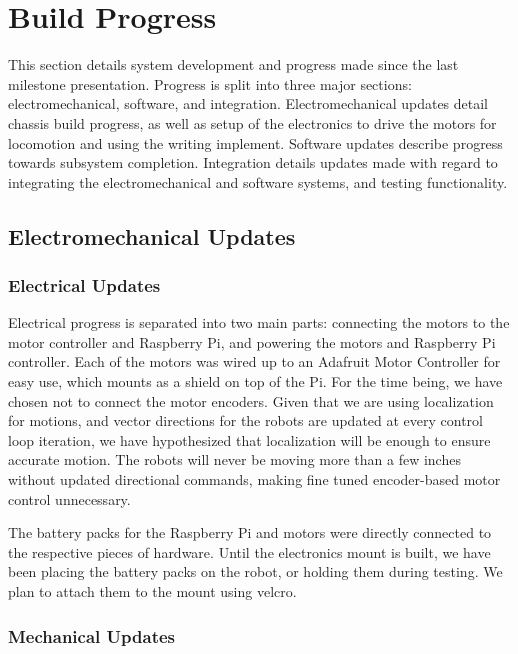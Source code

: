 
\section{Build Progress}
\label{sec:build_progress}

This section details system development and progress made since the last milestone presentation. Progress is split into three major sections: electromechanical, software, and integration. Electromechanical updates detail chassis build progress, as well as setup of the electronics to drive the motors for locomotion and using the writing implement. Software updates describe progress towards subsystem completion. Integration details updates made with regard to integrating the electromechanical and software systems, and testing functionality.

\subsection{Electromechanical Updates}
\label{sec:electromechanical_progress}

\subsubsection{Electrical Updates}
\label{sec:electrical_progress}
Electrical progress is separated into two main parts: connecting the motors to the motor controller and Raspberry Pi, and powering the motors and Raspberry Pi controller. Each of the motors was wired up to an Adafruit Motor Controller for easy use, which mounts as a shield on top of the Pi. For the time being, we have chosen not to connect the motor encoders. Given that we are using localization for motions, and vector directions for the robots are updated at every control loop iteration, we have hypothesized that localization will be enough to ensure accurate motion. The robots will never be moving more than a few inches without updated directional commands, making fine tuned encoder-based motor control unnecessary. 

The battery packs for the Raspberry Pi and motors were directly connected to the respective pieces of hardware. Until the electronics mount is built, we have been placing the battery packs on the robot, or holding them during testing. We plan to attach them to the mount using velcro.

\subsubsection{Mechanical Updates}
\label{sec:mechanical_progress}

